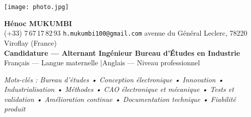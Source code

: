 \documentclass[10pt]{style}
\begin{document}
\begin{center}
  \begin{minipage}[c]{0.20\textwidth}
    \texttt{[image: photo.jpg]}
  \end{minipage}\hfill
  \begin{minipage}[c]{0.76\textwidth}
    \centering
    {\LARGE\bfseries Hénoc MUKUMBI}\\[-0.2em]
    \small (+33) 7\,67\,17\,82\,93 \quad\textbullet\quad \texttt{h.mukumbi100@gmail.com} \quad\textbullet{} avenue du Général Leclerc, 78220 Viroflay (France)\\[-0.1em]
    \normalsize \textbf{Candidature — Alternant Ingénieur Bureau d’Études en Industrie}\newline
    \small Français — Langue maternelle \quad|\quad Anglais — Niveau professionnel
  \end{minipage}
\end{center}

\begin{center}
  \textit{Mots-clés : Bureau d’études • Conception électronique • Innovation • Industrialisation • Méthodes • CAO électronique et mécanique • Tests et validation • Amélioration continue • Documentation technique • Fiabilité produit}
\end{center}
\end{document}
